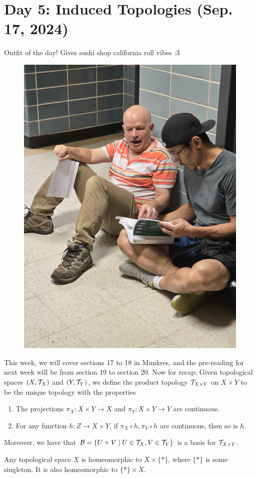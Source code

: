 \section{Day 5: Induced Topologies (Sep. 17, 2024)}
Outfit of the day! Gives sushi shop california roll vibes :3
\begin{figure}[h]
    \centering
    \includegraphics[scale=0.1]{MAT327 Notes/Dror Shirts/dror day 5 shirt.jpg}
\end{figure}

\noindent This week, we will cover sections 17 to 18 in Munkres, and the pre-reading for next week will be from section 19 to section 20. Now for recap;
\medskip\newline
\noindent Given topological spaces $(X, \mathcal T_X)$ and $(Y, \mathcal T_Y)$, we define the product topology $\mathcal T_{X \times Y}$ on $X \times Y$ to be the unique topology with the properties
\begin{enumerate}
    \item The projections $\pi_X : X \times Y \to X$ and $\pi_Y : X \times Y \to Y$ are continuous.
    \item For any function $h : Z \to X \times Y$, if $\pi_X \circ h, \pi_Y \circ h$ are continuous, then so is $h$.
\end{enumerate}
Moreover, we have that $\mathcal B = \{U \times V \mid U \in \mathcal T_X, V \in \mathcal T_Y\}$ is a basis for $\mathcal T_{X \times Y}$.
\begin{remark}
    Any topological space $X$ is homeomorphic to $X \times \{\ast\}$, where $\{\ast\}$ is some singleton. It is also homeomorphic to $\{\ast\} \times X$.
\end{remark}


